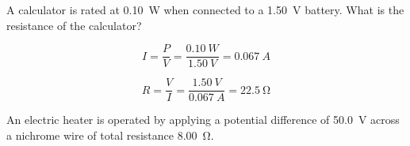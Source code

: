 \documentclass[]{exam}
\begin{document}
\begin{questions}
\question
A calculator is rated at \SI{0.10}{W} when connected to a \SI{1.50}{V} battery. What is the resistance of the calculator?

\begin{solution}
\begin{equation*}
    I = \frac{P}{V} = \frac{\SI{0.10}{W}}{\SI{1.50}{V}} = \SI{0.067}{A}
\end{equation*}

\begin{equation*}
    R = \frac{V}{I} = \frac{\SI{1.50}{V}}{\SI{0.067}{A}} = \boxed{\SI{22.5}{\ohm}} 
\end{equation*}
\end{solution}

\question
An electric heater is operated by applying a potential difference of \SI{50.0}{V} across a nichrome wire of total resistance \SI{8.00}{\ohm}.




\end{questions}

\clearpage
\end{document}
